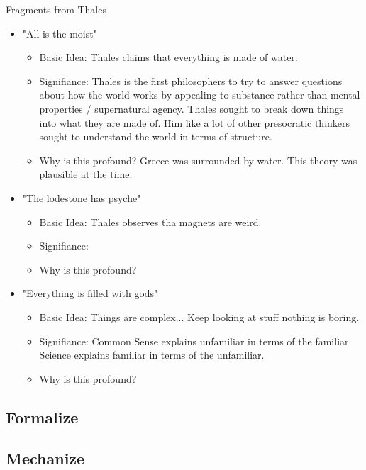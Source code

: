 \documentclass[twoside]{article}
\begin{document}
Fragments from Thales
\begin{itemize}
  \item "All is the moist"
    \begin{itemize}
      \item Basic Idea: Thales claims that everything is made of water.
      \item Signifiance: Thales is the first philosophers to try to answer questions
            about how the world works by appealing to substance rather than mental
            properties / supernatural agency. Thales sought to break down things into
            what they are made of. Him like a lot of other presocratic thinkers
            sought to understand the world in terms of structure.
      \item Why is this profound? Greece was surrounded by water. This theory
            was plausible at the time.
    \end{itemize}
  \item "The lodestone has psyche"
    \begin{itemize}
      \item Basic Idea: Thales observes tha magnets are weird.
      \item Signifiance:
      \item Why is this profound?
    \end{itemize}
  \item "Everything is filled with gods"
    \begin{itemize}
      \item Basic Idea: Things are complex... Keep looking at stuff nothing is boring.
      \item Signifiance: Common Sense explains unfamiliar in terms of the familiar.
      Science explains familiar in terms of the unfamiliar.
      \item Why is this profound?
    \end{itemize}
\end{itemize}


\subsection{Formalize}

\subsection{Mechanize}
\end{document}
